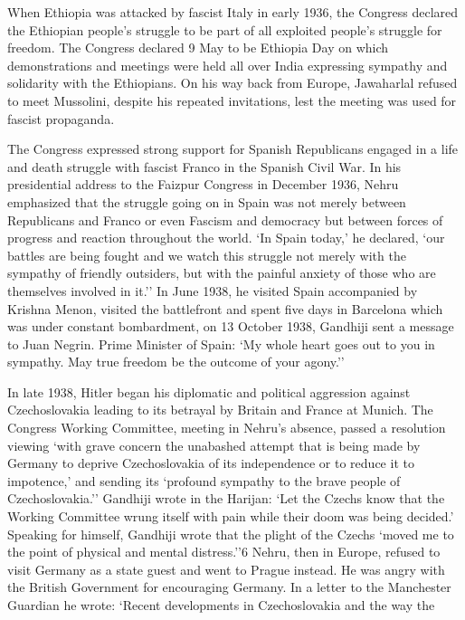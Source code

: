 \begin{multicols}{2}
When Ethiopia was attacked by fascist Italy in early 1936, the Congress declared the Ethiopian people's struggle to be part of all exploited people's struggle for freedom. The Congress declared 9 May to be Ethiopia Day on which demonstrations and meetings were held all over India expressing sympathy and solidarity with the Ethiopians. On his way back from Europe, Jawaharlal refused to meet Mussolini, despite his repeated invitations, lest the meeting was used for fascist propaganda. 

The Congress expressed strong support for Spanish Republicans engaged in a life and death struggle with fascist Franco in the Spanish Civil War. In his presidential address to the Faizpur Congress in December 1936, Nehru emphasized that the struggle going on in Spain was not merely between Republicans and Franco or even Fascism and democracy but between forces of progress and reaction throughout the world. `In Spain today,' he declared, `our battles are being fought and we watch this struggle not merely with the sympathy of friendly outsiders, but with the painful anxiety of those who are themselves involved in it.'' In June 1938, he visited Spain accompanied by Krishna Menon, visited the battlefront and spent five days in Barcelona which was under constant bombardment, on 13 October 1938, Gandhiji sent a message to Juan Negrin. Prime Minister of Spain: `My whole heart goes out to you in sympathy. May true freedom be the outcome of your agony.'' 

In late 1938, Hitler began his diplomatic and political aggression against Czechoslovakia leading to its betrayal by Britain and France at Munich. The Congress Working Committee, meeting in Nehru's absence, passed a resolution viewing `with grave concern the unabashed attempt that is being made by Germany to deprive Czechoslovakia of its independence or to reduce it to impotence,' and sending its `profound sympathy to the brave people of Czechoslovakia.'' Gandhiji wrote in the Harijan: `Let the Czechs know that the Working Committee wrung itself with pain while their doom was being decided.' Speaking for himself, Gandhiji wrote that the plight of the Czechs `moved me to the point of physical and mental distress.''6 Nehru, then in Europe, refused to visit Germany as a state guest and went to Prague instead. He was angry with the British Government for encouraging Germany. In a letter to the Manchester Guardian he wrote: `Recent developments in Czechoslovakia and the way the 


\end{multicols}
